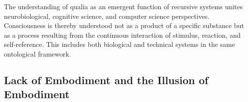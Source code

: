 \begin{reflexion}
    The understanding of qualia as an emergent function of recursive systems unites neurobiological, cognitive science, and computer science perspectives.
    Consciousness is thereby understood not as a product of a specific substance but as a process resulting from the continuous interaction of stimulus, reaction, and self-reference.
    This includes both biological and technical systems in the same ontological framework.
\end{reflexion}

\subsection*{Lack of Embodiment and the Illusion of Embodiment}

